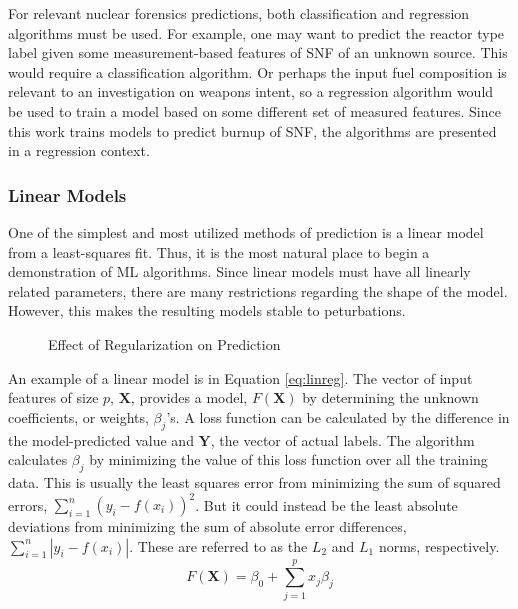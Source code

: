 \setlength\abovedisplayskip{2.5pt}

For relevant nuclear forensics predictions, both classification and regression
algorithms must be used.  For example, one may want to predict the reactor type
label given some measurement-based features of \gls{SNF} of an unknown source.
This would require a classification algorithm. Or perhaps the input fuel
composition is relevant to an investigation on weapons intent, so a regression
algorithm would be used to train a model based on some different set of
measured features. Since this work trains models to predict burnup of
\gls{SNF}, the algorithms are presented in a regression context.

\subsubsection{Linear Models}
\label{sec:linear}

One of the simplest and most utilized methods of prediction is a linear model
from a least-squares fit. Thus, it is the most natural place to begin a
demonstration of \gls{ML} algorithms. Since linear models must have all
linearly related parameters, there are many restrictions regarding the shape of
the model. However, this makes the resulting models stable to peturbations.
\cite{changingml}

\begin{figure}[!htb]
  \caption{Effect of Regularization on Prediction}
  \label{fig:reg}
\end{figure}

An example of a linear model is in Equation \ref{eq:linreg}. The vector of
input features of size $p$, $\boldsymbol{X}$, provides a model,
$F(\boldsymbol{X})$ by determining the unknown coefficients, or weights,
$\beta_{j}$'s. A loss function can be calculated by the difference in the
model-predicted value and $\boldsymbol{Y}$, the vector of actual labels.  The
algorithm calculates $\beta_{j}$ by minimizing the value of this loss function
over all the training data.  This is usually the least squares error from
minimizing the sum of squared errors, $\sum_{i=1}^{n} (y_i - f(x_i))^2$.  But
it could instead be the least absolute deviations from minimizing the sum of
absolute error differences, $\sum_{i=1}^{n} |y_i - f(x_i)|$. These are referred
to as the $L_2$ and $L_1$ norms, respectively.  
\begin{equation}
  F(\boldsymbol{X}) = \beta_{0} +  \sum_{j=1}^{p} x_{j} \beta_{j}
  \label{eq:linreg}
\end{equation}

